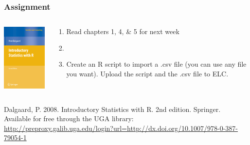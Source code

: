 \documentclass[color=usenames,dvipsnames]{beamer}\usepackage[]{graphicx}\usepackage[]{color}
\begin{document}
\begin{frame}[fragile]
  \frametitle{Assignment}
  \begin{columns}
    \begin{column}{0.3\textwidth}
      \includegraphics[width=1\textwidth]{figs/introStatsR} \\
    \end{column}
    \begin{column}{0.6\textwidth}
      \begin{enumerate}[\bf (1)]
        \item Read chapters 1, 4, \& 5 for next week
        \item[]
        \item Create an R script to import a .csv file (you can use
          any file you want). Upload the script and the .csv file to
          ELC.
      \end{enumerate}
    \end{column}
  \end{columns}
  \vfill
  \footnotesize
  Dalgaard, P. 2008. Introductory Statistics with R. 2nd
  edition. Springer. \\
  Available for free through the UGA library: \\ \tiny
  \url{http://preproxy.galib.uga.edu/login?url=http://dx.doi.org/10.1007/978-0-387-79054-1}
\end{frame}
\end{document}
